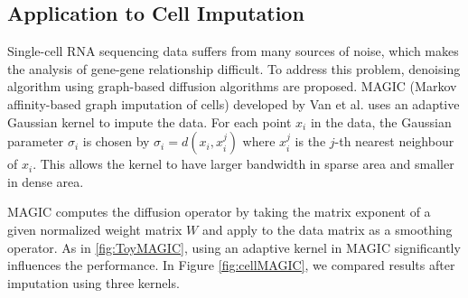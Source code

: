 \documentclass{article}
\begin{document}
\subsection{Application to Cell Imputation}\label{sec:MAGIC}

Single-cell RNA sequencing data suffers from many sources of noise, which makes the analysis of gene-gene relationship difficult. 
To address this problem, denoising algorithm using graph-based diffusion algorithms are proposed. 
MAGIC (Markov affinity-based graph imputation of cells) developed by Van et al. \cite{van2018recovering} uses an adaptive Gaussian kernel to impute the data. 
For each point $x_i$ in the data, the Gaussian parameter $\sigma_i$ is chosen by $\sigma_i = d(x_i, x^j_i)$ where $x^j_i$ is the $j$-th nearest neighbour of $x_i.$
This allows the kernel to have larger bandwidth in sparse area and smaller in dense area.

MAGIC computes the diffusion operator by taking the matrix exponent of a given normalized weight matrix $W$ and apply to the data matrix as a smoothing operator. 
As in \ref{fig:ToyMAGIC}, using an adaptive kernel in MAGIC significantly influences the performance. 
In Figure \ref{fig:cellMAGIC}, we compared results after imputation using three kernels.  
\end{document}
